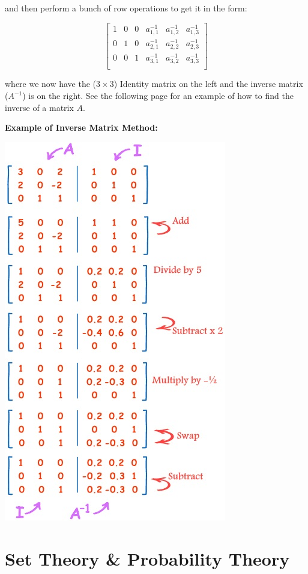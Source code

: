 \documentclass[12pt]{article}
\begin{document}
\begin{itemize}
and then perform a bunch of row operations to get it in the form:

\[
\left[
\begin{array}{ccc|ccc}
1 & 0 & 0 & a_{1,1}^{-1} & a_{1,2}^{-1} & a_{1,3}^{-1} \\[1em]
0 & 1 & 0 & a_{2,1}^{-1} & a_{2,2}^{-1} & a_{2,3}^{-1} \\[1em]
0 & 0 & 1 & a_{3,1}^{-1} & a_{3,2}^{-1} & a_{3,3}^{-1} \\
\end{array}
\right]
\]

where we now have the ($3 \times 3$) Identity matrix on the left and the inverse matrix ($A^{-1}$) is on the right. See the following page for an example of how to find the inverse of a matrix $A$.
\end{itemize}

\textbf{Example of Inverse Matrix Method:}

\includegraphics{InverseMatrixMethod.jpg}

\section{Set Theory \& Probability Theory}
\end{document}
